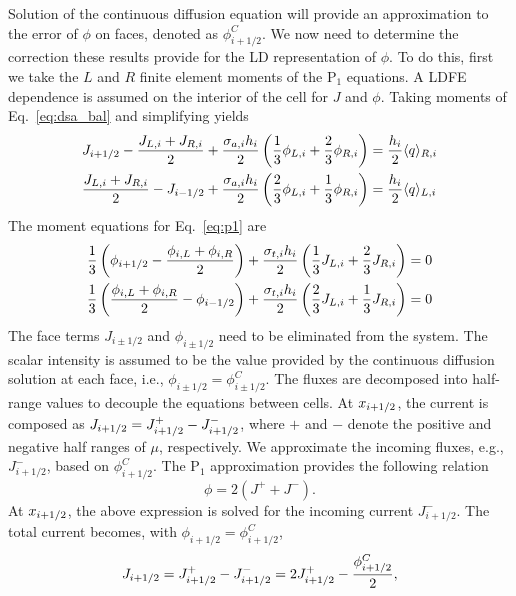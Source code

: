 Solution of the continuous diffusion equation will provide an approximation to the error
of $\phi$ on faces, denoted as $\phi_{i+1/2}^C$. We now need
to determine the correction these results provide for the LD representation of
$\phi$. To do this, first we take the $L$ and $R$ finite element moments of the P$_1$
equations.  A LDFE dependence is assumed on the interior of the cell for $J$ and
$\phi$.  Taking moments of Eq.~\eqref{eq:dsa_bal} and simplifying yields
\begin{align}
    J_{{i+1/2}} - \frac{J_{L,i} + J_{R,i}}{2} + \frac{\sigma_{a,i} h_i}{2} \left(\frac{1}{3} \phi_{L,i} +
    \frac{2}{3}\phi_{R,i}\right) &= \frac{h_i}{2} \langle q \rangle_{R,i} \\
    \frac{J_{L,i} + J_{R,i}}{2} - J_{i-1/2} + \frac{\sigma_{a,i} h_i}{2}
    \left(\frac{2}{3} \phi_{L,i} +
    \frac{1}{3}\phi_{R,i}\right) &= \frac{h_i}{2} \langle q \rangle_{L,i}
\end{align}
The moment equations for Eq.~\eqref{eq:p1} are
\begin{align}
    \frac{1}{3}\left(\phi_{{i+1/2}} - \frac{\phi_{i,L} + \phi_{i,R}}{2}\right) +
    \frac{\sigma_{t,i} h_i}{2} \left(\frac{1}{3} J_{L,i} + \frac{2}{3}J_{R,i}\right)
    &= 0 \\
    \frac{1}{3}\left(\frac{\phi_{i,L} + \phi_{i,R}}{2} - \phi_{i-1/2} \right) +
    \frac{\sigma_{t,i} h_i}{2} \left(\frac{2}{3} J_{L,i} + \frac{1}{3}J_{R,i}\right)
    &= 0 
\end{align}
The face terms $J_{i\pm 1/2}$ and $\phi_{i\pm 1/2}$ need to be eliminated from the
system. The scalar intensity is assumed to be the value provided by the continuous
diffusion solution at each face, i.e., $\phi_{i\pm1/2} = \phi_{i\pm1/2}^C$.
The fluxes are decomposed into half-range values to decouple the equations
between cells.  At $x_{{i+1/2}}$, the current is composed as $J_{i+1/2} = J_{{i+1/2}}^+ - J_{{i+1/2}}^-$,
where $+$ and $-$ denote the positive and negative
half ranges of $\mu$, respectively.  We approximate the incoming fluxes, e.g.,
$J_{i+1/2}^-$, based on $\phi_{i+1/2}^C$.  
The P$_1$ approximation provides the following relation~\cite{wla_thesis}
\begin{equation}
    \phi = 2(J^+ + J^-).
\end{equation}
At ${x_{i+1/2}}$, the above expression is solved for the incoming current $J_{i+1/2}^-$.  The
total current becomes, with $\phi_{i+1/2}=\phi_{i+1/2}^C$,
\begin{equation}\label{eq:jelim}
    J_{{i+1/2}} = J_{{i+1/2}}^+ - J_{{i+1/2}}^- = 2J_{{i+1/2}}^+ - \frac{\phi_{i+1/2}^C}{2},
\end{equation}

